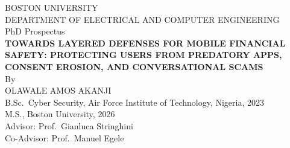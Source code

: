 \documentclass[letterpaper,11pt]{article}
\begin{document}
\begin{titlepage}
\begin{center}
\large
BOSTON UNIVERSITY\\[0.5em]
DEPARTMENT OF ELECTRICAL AND COMPUTER ENGINEERING\\[2em]
PhD Prospectus\\[3em]

{\bfseries TOWARDS LAYERED DEFENSES FOR MOBILE FINANCIAL SAFETY:
PROTECTING USERS FROM PREDATORY APPS, CONSENT EROSION, AND
CONVERSATIONAL SCAMS}\\[3em]

By\\[2em]

OLAWALE AMOS AKANJI\\
B.Sc.\ Cyber Security, Air Force Institute of Technology, Nigeria, 2023\\
M.S., Boston University, 2026\\[3em]

Advisor: Prof.\ Gianluca Stringhini\\
Co-Advisor: Prof.\ Manuel Egele
\end{center}

\vfill


\end{titlepage}
\end{document}

